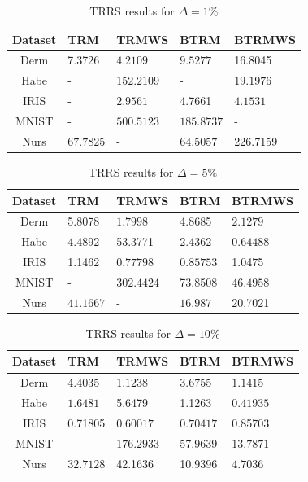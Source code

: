 \documentclass[letterpaper,12pt,titlepage,oneside,final]{book}
\begin{document}
	
	\begin{table}[h] 
		\centering 
		\begin{tabular}{ |c||l|l||l|l|| } 
			\hline 
			\textbf{Dataset} & \textbf{TRM} & \textbf{TRMWS} & \textbf{BTRM} & \textbf{BTRMWS} \\ 
			\hline 
			\hline 
			Derm &7.3726 & $\mathbf{4.2109}$ & $\mathbf{9.5277}$ &16.8045\\ 
			\hline 
			Habe & - & $\mathbf{152.2109}$ & - & $\mathbf{19.1976}$\\ 
			\hline 
			IRIS & - & $\mathbf{2.9561}$ &4.7661 & $\mathbf{4.1531}$\\ 
			\hline 
			MNIST & - & $\mathbf{500.5123}$ & $\mathbf{185.8737}$ & -\\ 
			\hline 
			Nurs & $\mathbf{67.7825}$ & - & $\mathbf{64.5057}$ &226.7159\\ 
			\hline 
		\end{tabular} 
		
		\caption{TRRS results for $\Delta = 1 \%$} \label{table:TRMWS1} 
	\end{table} 
	\begin{table}[h] 
		\centering 
		\begin{tabular}{ |c||l|l||l|l|| } 
			\hline 
			\textbf{Dataset} & \textbf{TRM} & \textbf{TRMWS} & \textbf{BTRM} & \textbf{BTRMWS} \\ 
			\hline 
			\hline 
			Derm &5.8078 & $\mathbf{1.7998}$ &4.8685 & $\mathbf{2.1279}$\\ 
			\hline 
			Habe & $\mathbf{4.4892}$ &53.3771 &2.4362 & $\mathbf{0.64488}$\\ 
			\hline 
			IRIS &1.1462 & $\mathbf{0.77798}$ & $\mathbf{0.85753}$ &1.0475\\ 
			\hline 
			MNIST & - & $\mathbf{302.4424}$ &73.8508 & $\mathbf{46.4958}$\\ 
			\hline 
			Nurs & $\mathbf{41.1667}$ & - & $\mathbf{16.987}$ &20.7021\\ 
			\hline 
		\end{tabular} 
		
		\caption{TRRS results for $\Delta = 5\%$} \label{table:TRMWS5}
	\end{table}
	\begin{table}[h] 
		\centering 
		\begin{tabular}{ |c||l|l||l|l|| } 
			\hline 
			\textbf{Dataset} & \textbf{TRM} & \textbf{TRMWS} & \textbf{BTRM} & \textbf{BTRMWS} \\ 
			\hline 
			\hline 
			Derm &4.4035 & $\mathbf{1.1238}$ &3.6755 & $\mathbf{1.1415}$\\ 
			\hline 
			Habe & $\mathbf{1.6481}$ &5.6479 &1.1263 & $\mathbf{0.41935}$\\ 
			\hline 
			IRIS &0.71805 & $\mathbf{0.60017}$ & $\mathbf{0.70417}$ &0.85703\\ 
			\hline 
			MNIST & - & $\mathbf{176.2933}$ &57.9639 & $\mathbf{13.7871}$\\ 
			\hline 
			Nurs & $\mathbf{32.7128}$ &42.1636 &10.9396 & $\mathbf{4.7036}$\\ 
			\hline 
		\end{tabular} 
		\caption{TRRS results for $\Delta = 10 \%$} \label{table:TRMWS10} \end{table}
	
\end{document}
